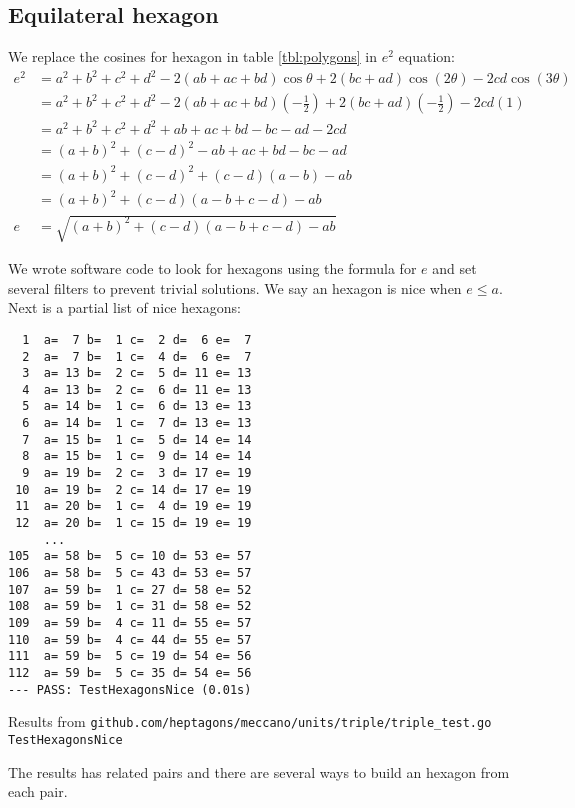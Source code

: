 \documentclass[11pt]{article}
\begin{document}
\subsection{Equilateral hexagon}

We replace the cosines for hexagon in table \ref{tbl:polygons} in $e^2$ equation:
\begin{align}
e^2 &= a^2 +b^2 +c^2 +d^2 -2(ab+ac+bd)\cos\theta +2(bc+ad)\cos(2\theta) -2cd\cos(3\theta) \nonumber\\
 &= a^2 +b^2 +c^2 +d^2 -2(ab+ac+bd)\left(-\frac{1}{2}\right) +2(bc+ad)\left(-\frac{1}{2}\right) -2cd(1) \nonumber\\
 &= a^2 +b^2 +c^2 +d^2 +ab+ac+bd -bc-ad-2cd \nonumber\\
 &= (a+b)^2 +(c-d)^2 -ab+ac+bd-bc-ad\nonumber\\
 &= (a+b)^2 +(c-d)^2 +(c-d)(a-b) -ab \nonumber\\
 &= (a+b)^2 +(c-d)(a-b+c-d) -ab \nonumber\\
e &= \sqrt{(a+b)^2 +(c-d)(a-b+c-d) -ab}
\end{align} 

We wrote software code to look for hexagons using the formula for $e$ and set several
filters to prevent trivial solutions. We say an hexagon is nice when $e \leq a$.
Next is a partial list of nice hexagons:
\begin{lstlisting}
  1  a=  7 b=  1 c=  2 d=  6 e=  7
  2  a=  7 b=  1 c=  4 d=  6 e=  7
  3  a= 13 b=  2 c=  5 d= 11 e= 13
  4  a= 13 b=  2 c=  6 d= 11 e= 13
  5  a= 14 b=  1 c=  6 d= 13 e= 13
  6  a= 14 b=  1 c=  7 d= 13 e= 13
  7  a= 15 b=  1 c=  5 d= 14 e= 14
  8  a= 15 b=  1 c=  9 d= 14 e= 14
  9  a= 19 b=  2 c=  3 d= 17 e= 19
 10  a= 19 b=  2 c= 14 d= 17 e= 19
 11  a= 20 b=  1 c=  4 d= 19 e= 19
 12  a= 20 b=  1 c= 15 d= 19 e= 19
     ...
105  a= 58 b=  5 c= 10 d= 53 e= 57
106  a= 58 b=  5 c= 43 d= 53 e= 57
107  a= 59 b=  1 c= 27 d= 58 e= 52
108  a= 59 b=  1 c= 31 d= 58 e= 52
109  a= 59 b=  4 c= 11 d= 55 e= 57
110  a= 59 b=  4 c= 44 d= 55 e= 57
111  a= 59 b=  5 c= 19 d= 54 e= 56
112  a= 59 b=  5 c= 35 d= 54 e= 56
--- PASS: TestHexagonsNice (0.01s)
\end{lstlisting}
Results from \texttt{github.com/heptagons/meccano/units/triple/triple\_test.go TestHexagonsNice}

The results has related pairs and there are several ways to build an hexagon from each pair.
\end{document}
